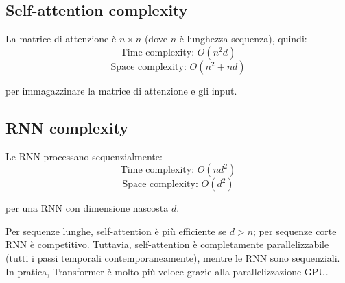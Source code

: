 \subsection{Self-attention complexity}

La matrice di attenzione è $n \times n$ (dove $n$ è lunghezza sequenza), quindi:
\[
\text{Time complexity: } O(n^2 d)
\]
\[
\text{Space complexity: } O(n^2 + nd)
\]

per immagazzinare la matrice di attenzione e gli input.

\subsection{RNN complexity}

Le RNN processano sequenzialmente:
\[
\text{Time complexity: } O(n d^2)
\]
\[
\text{Space complexity: } O(d^2)
\]

per una RNN con dimensione nascosta $d$.

Per sequenze lunghe, self-attention è più efficiente se $d > n$; per sequenze corte RNN è competitivo. Tuttavia, self-attention è completamente parallelizzabile (tutti i passi temporali contemporaneamente), mentre le RNN sono sequenziali. In pratica, Transformer è molto più veloce grazie alla parallelizzazione GPU.

